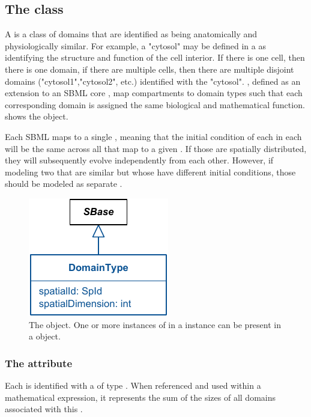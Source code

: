 \subsection{The  class}
\label{DomainType-class}
A \DomainType is a class of domains that are identified as being anatomically and physiologically similar.  For example, a \DomainType "cytosol" may be defined in a \Geometry as identifying the structure and function of the cell interior.  If there is one cell, then there is one domain, if there are multiple cells, then there are multiple disjoint domains ("cytosol1","cytosol2", etc.) identified with the \DomainType "cytosol".  \CompartmentMappings, defined as an extension to an SBML core \Compartment, map compartments to domain types such that each corresponding domain is assigned the same biological and mathematical function.  shows the \DomainType object.

Each SBML \Compartment maps to a single \DomainType, meaning that the initial condition of each \Species in each \Compartment will be the same across all \Domains that map to a given \DomainType.  If those \Species are spatially distributed, they will subsequently evolve independently from each other.  However, if modeling two \Domains that are similar but whose \Species have different initial conditions, those \Domains should be modeled as separate \DomainTypes.

\begin{figure}[ht]
  \includegraphics{figs/DomainType-uml}
  \caption{The \DomainType object. One or more instances of \DomainType in a \ListOfDomainTypes instance can be present in a \Geometry object.}
  \label{DomainType-uml}
\end{figure}

\subsubsection{The  attribute}
Each \DomainType is identified with a  of type .  When referenced and used within a mathematical expression, it represents the sum of the sizes of all domains associated with this \DomainType.


